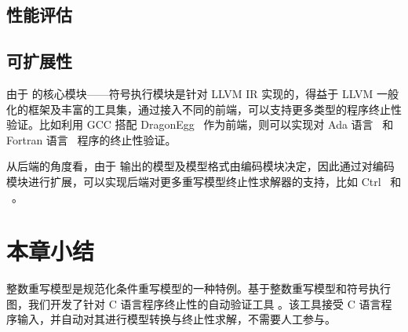 \subsection{性能评估} 
 

\subsection{可扩展性}

由于 \CTerm 的核心模块——符号执行模块是针对 LLVM IR 实现的，得益于 LLVM 一般化的框架及丰富的工具集，通过接入不同的前端，\CTerm 可以支持更多类型的程序终止性验证。比如利用 GCC 搭配 DragonEgg~\cite{dragonegg} 作为前端，则可以实现对 Ada 语言~\cite{DBLP:journals/computer/WolfeBSTW81} 和 Fortran 语言~\cite{DBLP:books/sp/ChiversS15} 程序的终止性验证。

从后端的角度看，由于 \CTerm 输出的模型及模型格式由编码模块决定，因此通过对编码模块进行扩展，可以实现后端对更多重写模型终止性求解器的支持，比如 Ctrl~\cite{DBLP:conf/lpar/Kop015} 和 \TTT~\cite{DBLP:conf/rta/KorpSZM09}。 


\section{本章小结}

整数重写模型是规范化条件重写模型的一种特例。基于整数重写模型和符号执行图，我们开发了针对 C 语言程序终止性的自动验证工具 \CTerm。该工具接受 C 语言程序输入，并自动对其进行模型转换与终止性求解，不需要人工参与。


